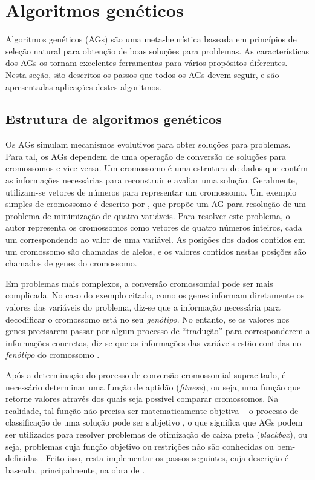 \section{Algoritmos genéticos}

Algoritmos genéticos (AGs) são uma meta-heurística baseada em princípios de seleção natural para obtenção de boas soluções para problemas. As características dos AGs os tornam excelentes ferramentas para vários propósitos diferentes. Nesta seção, são descritos os passos que todos os AGs devem seguir, e são apresentadas aplicações destes algoritmos.

\subsection{Estrutura de algoritmos genéticos}

Os AGs simulam mecanismos evolutivos para obter soluções para problemas. Para tal, os AGs dependem de uma operação de conversão de soluções para cromossomos e vice-versa. Um cromossomo é uma estrutura de dados que contém as informações necessárias para reconstruir e avaliar uma solução. Geralmente, utilizam-se vetores de números para representar um cromossomo. Um exemplo simples de cromossomo é descrito por \textcite{HERMAWANTO2013}, que propõe um AG para resolução de um problema de minimização de quatro variáveis. Para resolver este problema, o autor representa os cromossomos como vetores de quatro números inteiros, cada um correspondendo ao valor de uma variável. As posições dos dados contidos em um cromossomo são chamadas de alelos, e os valores contidos nestas posições são chamados de genes do cromossomo.

Em problemas mais complexos, a conversão cromossomial pode ser mais complicada. No caso do exemplo citado, como os genes informam diretamente os valores das variáveis do problema, diz-se que a informação necessária para decodificar o cromossomo está no seu \emph{genótipo}. No entanto, se os valores nos genes precisarem passar por algum processo de ``tradução'' para corresponderem a informações concretas, diz-se que as informações das variáveis estão contidas no \emph{fenótipo} do cromossomo \cite{GENDREAU2010}.

Após a determinação do processo de conversão cromossomial supracitado, é necessário determinar uma função de aptidão (\emph{fitness}), ou seja, uma função que retorne valores através dos quais seja possível comparar cromossomos. Na realidade, tal função não precisa ser matematicamente objetiva -- o processo de classificação de uma solução pode ser subjetivo \cite{SASTRY2005}, o que significa que AGs podem ser utilizados para resolver problemas de otimização de caixa preta (\emph{blackbox}), ou seja, problemas cuja função objetivo ou restrições não são conhecidas ou bem-definidas \cite{ALARIE2021}. Feito isso, resta implementar os passos seguintes, cuja descrição é baseada, principalmente, na obra de \textcite{SASTRY2005}.

